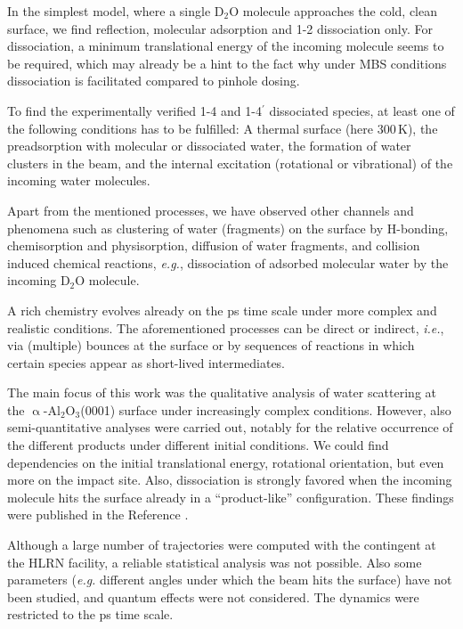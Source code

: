 \documentclass[11pt,DIV=13,BCOR=5mm,a4paper,headinclude]{scrbook}
\begin{document}
In the simplest model, where a single D$_2$O molecule approaches the cold, clean surface, we find reflection, molecular adsorption and 1-2 dissociation only.
For dissociation, a minimum translational energy of the incoming molecule seems to be required, which may already be a hint to the fact why under MBS conditions dissociation is facilitated compared to pinhole dosing.

To find the experimentally verified 1-4 and 1-4$^\prime$ dissociated species, at least one of the following conditions has to be fulfilled:
A thermal surface (here $300\,$K), the preadsorption with molecular or dissociated water, the formation of water clusters in the beam, and the internal excitation (rotational or vibrational) of the incoming water molecules.

Apart from the mentioned processes, we have observed other channels and phenomena such as clustering of water (fragments) on the surface by H-bonding, chemisorption and physisorption, diffusion of water fragments, and collision induced chemical reactions, \textit{e.g.}, dissociation of adsorbed molecular water by the incoming D$_2$O molecule.

A rich chemistry evolves already on the ps time scale under more complex and realistic conditions.
The aforementioned processes can be direct or indirect, \textit{i.e.}, via (multiple) bounces at the surface or by sequences of reactions in which certain species appear as short-lived intermediates.

The main focus of this work was the qualitative analysis of water scattering at the $\upalpha$-Al$_2$O$_3$(0001) surface under increasingly complex conditions.
However, also semi-quantitative analyses were carried out, notably for the relative occurrence of the different products under different initial conditions.
We could find dependencies on the initial translational energy, rotational orientation, but even more on the impact site.
Also, dissociation is strongly favored when the incoming molecule hits the surface already in a ``product-like'' configuration.
These findings were published in the Reference \cite{Heiden0001_2018}.


Although a large number of trajectories were computed with the contingent at the HLRN facility, a reliable statistical analysis was not possible.
Also some parameters (\textit{e.g.} different angles under which the beam hits the surface) have not been studied, and quantum effects were not considered.
The dynamics were restricted to the ps time scale.
\clearpage
\end{document}
